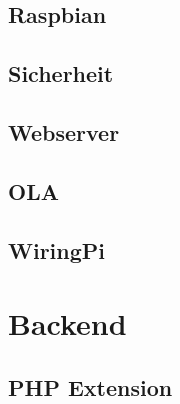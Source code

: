 \documentclass[
    headings=optiontotocandhead,%
    oneside,
    numbers=noenddot,%
    toc=flat, %
    12pt, %
    titlepage, %
    parskip=full, %
    listof=totoc, %
    listof=flat, %
    numbers=noenddot, %
    bibliography=totoc, %
    a4paper,DIV=14,
    BCOR=15mm,
]{scrbook}
\begin{document}
\section{Raspbian}\label{Raspbian}

\renewcommand{\kapitelautor}{Autor: Clemens Scharwitzl}



\section{Sicherheit}\label{Sicherheit}

\renewcommand{\kapitelautor}{Autor: Clemens Scharwitzl}



\section{Webserver}\label{Webserver}

\renewcommand{\kapitelautor}{Autor: Clemens Scharwitzl}



\section{OLA}\label{ola}

\renewcommand{\kapitelautor}{Autor: Clemens Scharwitzl}



\section{WiringPi}\label{WiringPi}

\renewcommand{\kapitelautor}{Autor: Clemens Scharwitzl}



\chapter{Backend}\label{Backend}

\section{PHP Extension}\label{PHP-Extension}
\end{document}
